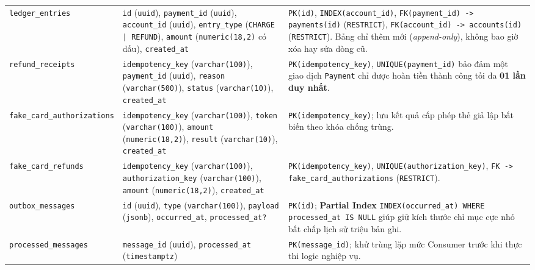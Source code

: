 \documentclass[12pt,a4paper]{article}
\newcommand{\ab}{\allowbreak}
\begin{document}
{\begin{longtable}{L{3.5cm} L{5.0cm} L{6.5cm}}
\texttt{ledger\_entries} &
\texttt{id} (\texttt{uuid}), \texttt{payment\_id} (\texttt{uuid}), \texttt{account\_id} (\texttt{uuid}), \texttt{entry\_type} (\texttt{CHARGE | REFUND}), \texttt{amount} (\texttt{numeric(18,2)} có dấu), \texttt{created\_at} &
\texttt{PK(id)}, \texttt{INDEX(account\_id)}, \texttt{FK(payment\_id) -> payments(id)} (\texttt{RESTRICT}), \texttt{FK(account\_id) -> accounts(id)} (\texttt{RESTRICT}). Bảng chỉ thêm mới (\textit{append-only}), không bao giờ xóa hay sửa dòng cũ. \\
\addlinespace

\texttt{refund\_receipts} &
\texttt{idempotency\_key} (\texttt{varchar(100)}), \texttt{payment\_id} (\texttt{uuid}), \texttt{reason} (\texttt{varchar(500)}), \texttt{status} (\texttt{varchar(10)}), \texttt{created\_at} &
\texttt{PK(idempotency\_key)}, \texttt{UNIQUE(payment\_id)} bảo đảm một giao dịch \texttt{Payment} chỉ được hoàn tiền thành công tối đa \textbf{01 lần duy nhất}. \\
\addlinespace

\texttt{fake\_card\_\ab authorizations} &
\texttt{idempotency\_key} (\texttt{varchar(100)}), \texttt{token} (\texttt{varchar(100)}), \texttt{amount} (\texttt{numeric(18,2)}), \texttt{result} (\texttt{varchar(10)}), \texttt{created\_at} &
\texttt{PK(idempotency\_key)}; lưu kết quả cấp phép thẻ giả lập bất biến theo khóa chống trùng. \\
\addlinespace

\texttt{fake\_card\_\ab refunds} &
\texttt{idempotency\_key} (\texttt{varchar(100)}), \texttt{authorization\_key} (\texttt{varchar(100)}), \texttt{amount} (\texttt{numeric(18,2)}), \texttt{created\_at} &
\texttt{PK(idempotency\_key)}, \texttt{UNIQUE(authorization\_key)}, \texttt{FK -> fake\_card\_authorizations} (\texttt{RESTRICT}). \\
\addlinespace

\texttt{outbox\_messages} &
\texttt{id} (\texttt{uuid}), \texttt{type} (\texttt{varchar(100)}), \texttt{payload} (\texttt{jsonb}), \texttt{occurred\_at}, \texttt{processed\_at?} &
\texttt{PK(id)}; \textbf{Partial Index} \texttt{INDEX(occurred\_at) WHERE processed\_at IS NULL} giúp giữ kích thước chỉ mục cực nhỏ bất chấp lịch sử triệu bản ghi. \\
\addlinespace

\texttt{processed\_messages} &
\texttt{message\_id} (\texttt{uuid}), \texttt{processed\_at} (\texttt{timestamptz}) &
\texttt{PK(message\_id)}; khử trùng lặp mức Consumer trước khi thực thi logic nghiệp vụ. \\
\end{longtable}
\renewcommand{\arraystretch}{1.0}
}
\end{document}

